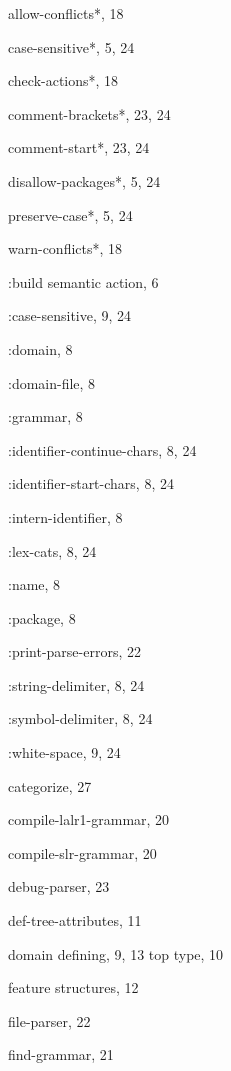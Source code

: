 \begin{theindex}

  \item *allow-conflicts*, 18
  \item *case-sensitive*, 5, 24
  \item *check-actions*, 18
  \item *comment-brackets*, 23, 24
  \item *comment-start*, 23, 24
  \item *disallow-packages*, 5, 24
  \item *preserve-case*, 5, 24
  \item *warn-conflicts*, 18
  \item :build semantic action, 6
  \item :case-sensitive, 9, 24
  \item :domain, 8
  \item :domain-file, 8
  \item :grammar, 8
  \item :identifier-continue-chars, 8, 24
  \item :identifier-start-chars, 8, 24
  \item :intern-identifier, 8
  \item :lex-cats, 8, 24
  \item :name, 8
  \item :package, 8
  \item :print-parse-errors, 22
  \item :string-delimiter, 8, 24
  \item :symbol-delimiter, 8, 24
  \item :white-space, 9, 24

  \indexspace

  \item categorize, 27
  \item compile-lalr1-grammar, 20
  \item compile-slr-grammar, 20

  \indexspace

  \item debug-parser, 23
  \item def-tree-attributes, 11
  \item domain
      \subitem defining, 9, 13
      \subitem top type, 10

  \item feature structures, 12
  \item file-parser, 22
  \item find-grammar, 21


\end{theindex}
